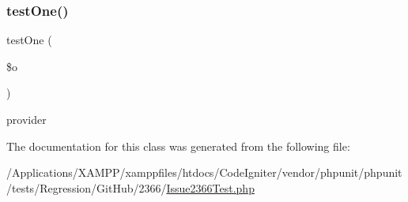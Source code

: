 \mbox{\label{class_issue2366_test_a094aa59b900c7b2941a47124f5e5cf5b}} 
\subsubsection{\texorpdfstring{test\+One()}{testOne()}}
{\footnotesize\ttfamily test\+One (\begin{DoxyParamCaption}\item[{}]{\$o }\end{DoxyParamCaption})}

provider 

The documentation for this class was generated from the following file\+:\begin{DoxyCompactItemize}
\item 
/\+Applications/\+X\+A\+M\+P\+P/xamppfiles/htdocs/\+Code\+Igniter/vendor/phpunit/phpunit/tests/\+Regression/\+Git\+Hub/2366/\mbox{\hyperlink{_issue2366_test_8php}{Issue2366\+Test.\+php}}\end{DoxyCompactItemize}
